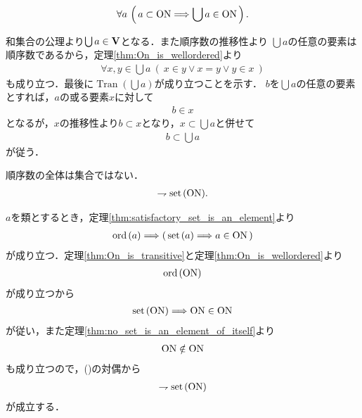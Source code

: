 	\begin{screen}
		\begin{thm}[$\ON$の部分集合の合併は順序数となる]\label{thm:union_of_set_of_ordinal_numbers_is_ordinal}
			\begin{align}
				\forall a\,
				\left(\, a \subset \mathrm{ON} \Longrightarrow \bigcup a \in \mathrm{ON}\, \right).
			\end{align}
		\end{thm}
	\end{screen}
	
	\begin{prf}
		和集合の公理より$\bigcup a \in \mathbf{V}$となる．また順序数の推移性より
		$\bigcup a$の任意の要素は順序数であるから，定理\ref{thm:On_is_wellordered}より
		\begin{align}
			\forall x,y \in \bigcup a\ (\ x \in y \vee x = y \vee y \in x\ )
		\end{align}
		も成り立つ．最後に$\operatorname{Tran}(\bigcup a)$が成り立つことを示す．
		$b$を$\bigcup a$の任意の要素とすれば，$a$の或る要素$x$に対して
		\begin{align}
			b \in x
		\end{align}
		となるが，$x$の推移性より$b \subset x$となり，$x \subset \bigcup a$と併せて
		\begin{align}
			b \subset \bigcup a
		\end{align}
		が従う．
		\QED
	\end{prf}
	
	\begin{screen}
		\begin{thm}\label{thm:Burali_Forti}
			順序数の全体は集合ではない．
			\begin{align}
				\rightharpoondown \operatorname*{set}\hspace{0.15em}(\mathrm{ON}).
			\end{align}
		\end{thm}
	\end{screen}
	
	\begin{prf}
		$a$を類とするとき，定理\ref{thm:satisfactory_set_is_an_element}より
		\begin{align}
			\operatorname*{ord}\hspace{0.15em}(a) \Longrightarrow \left(\, \operatorname*{set}\hspace{0.15em}(a) \Longrightarrow a \in \mathrm{ON}\, \right)
		\end{align}
		が成り立つ．定理\ref{thm:On_is_transitive}と定理\ref{thm:On_is_wellordered}より
		\begin{align}
			\operatorname*{ord}\hspace{0.15em}(\mathrm{ON})
		\end{align}
		が成り立つから
		\begin{align}
			\operatorname*{set}\hspace{0.15em}(\mathrm{ON}) \Longrightarrow \mathrm{ON} \in \mathrm{ON}
			\label{eq:Burali_Forti_1}
		\end{align}
		が従い，また定理\ref{thm:no_set_is_an_element_of_itself}より
		\begin{align}
			\mathrm{ON} \notin \mathrm{ON}
		\end{align}
		も成り立つので，()の対偶から
		\begin{align}
			\rightharpoondown \operatorname*{set}\hspace{0.15em}(\mathrm{ON})
		\end{align}
		が成立する．
		\QED
	\end{prf}
	
